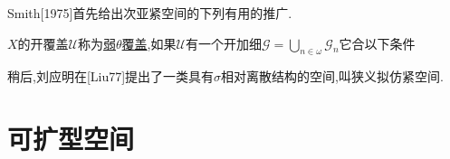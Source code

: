 \documentclass[main.tex]{subfiles}
\begin{document}
Smith[1975]首先给出次亚紧空间的下列有用的推广.

\begin{definition}
$X$的开覆盖$\mathscr{U}$称为\underline{弱$\theta$覆盖},如果$\mathscr{U}$有一个开加细$\mathscr{G}=\bigcup_{n\in\omega}\mathscr{G}_n$它合以下条件
\end{definition}

稍后,刘应明在[Liu77]提出了一类具有$\sigma$相对离散结构的空间,叫狭义拟仿紧空间.


\section{可扩型空间}\label{ch1.3}
	
\end{document}
